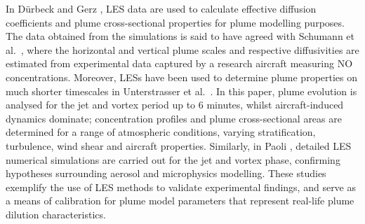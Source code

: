 In D{\"u}rbeck and Gerz \cite{Durbeck1995}, LES data are used to calculate effective diffusion coefficients and plume cross-sectional properties for plume modelling purposes. The data obtained from the simulations is said to have agreed with Schumann et al.\ \cite{Schumann1995}, where the horizontal and vertical plume scales and respective diffusivities are estimated from experimental data captured by a research aircraft measuring NO concentrations. Moreover, LESs have been used to determine plume properties on much shorter timescales in Unterstrasser et al.\ \cite{Unterstrasser2014}. In this paper, plume evolution is analysed for the jet and vortex period up to 6 minutes, whilst aircraft-induced dynamics dominate; concentration profiles and plume cross-sectional areas are determined for a range of atmospheric conditions, varying stratification, turbulence, wind shear and aircraft properties. Similarly, in Paoli \cite{Paoli2008}, detailed LES numerical simulations are carried out for the jet and vortex phase, confirming hypotheses surrounding aerosol and microphysics modelling. These studies exemplify the use of LES methods to validate experimental findings, and serve as a means of calibration for plume model parameters that represent real-life plume dilution characteristics.




